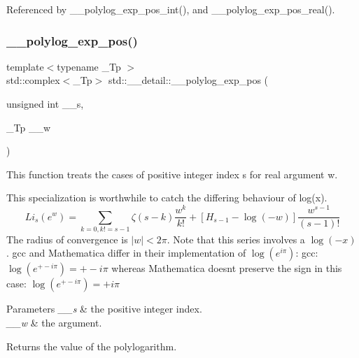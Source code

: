 Referenced by \+\_\+\+\_\+polylog\+\_\+exp\+\_\+pos\+\_\+int(), and \+\_\+\+\_\+polylog\+\_\+exp\+\_\+pos\+\_\+real().

\mbox{\label{namespacestd_1_1____detail_ab13a4be6685dd222b654da3297342d7e}} 
\subsubsection{\texorpdfstring{\+\_\+\+\_\+polylog\+\_\+exp\+\_\+pos()}{\_\_polylog\_exp\_pos()}\hspace{0.1cm}{\footnotesize\ttfamily [2/3]}}
{\footnotesize\ttfamily template$<$typename \+\_\+\+Tp $>$ \\
std\+::complex$<$\+\_\+\+Tp$>$ std\+::\+\_\+\+\_\+detail\+::\+\_\+\+\_\+polylog\+\_\+exp\+\_\+pos (\begin{DoxyParamCaption}\item[{unsigned int}]{\+\_\+\+\_\+s,  }\item[{\+\_\+\+Tp}]{\+\_\+\+\_\+w }\end{DoxyParamCaption})}

This function treats the cases of positive integer index s for real argument w.

This specialization is worthwhile to catch the differing behaviour of log(x). \[ Li_s(e^w) = \sum_{k=0, k != s-1} \zeta(s-k) \frac{w^k}{k!} + \left[H_{s-1} - \log(-w)\right] \frac{w^{s-1}}{(s-1)!} \] The radius of convergence is $ |w| < 2 \pi $. Note that this series involves a $ \log(-x) $. gcc and Mathematica differ in their implementation of $ \log(e^{i\pi}) $\+: gcc\+: $ \log(e^{+-i\pi}) = +-i\pi $ whereas Mathematica doesn\textquotesingle{}t preserve the sign in this case\+: $ \log(e^{+- i\pi}) = +i\pi $


\begin{DoxyParams}{Parameters}
{\em \+\_\+\+\_\+s} & the positive integer index. \\
\hline
{\em \+\_\+\+\_\+w} & the argument. \\
\hline
\end{DoxyParams}
\begin{DoxyReturn}{Returns}
the value of the polylogarithm. 
\end{DoxyReturn}


